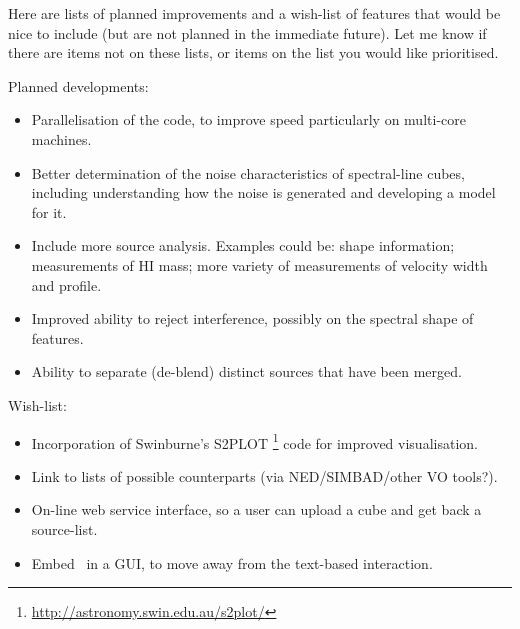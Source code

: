 
Here are lists of planned improvements and a wish-list of
features that would be nice to include (but are not planned in the
immediate future). Let me know if there are items not on these lists,
or items on the list you would like prioritised.

Planned developments:
\begin{itemize}
\item Parallelisation of the code, to improve speed particularly on
multi-core machines.

\item Better determination of the noise characteristics of
  spectral-line cubes, including understanding how the noise is
  generated and developing a model for it. 
  
\item Include more source analysis. Examples could be: shape
  information; measurements of HI mass; more variety of measurements
  of velocity width and profile. 

\item Improved ability to reject interference, possibly on the
  spectral shape of features.

\item Ability to separate (de-blend) distinct sources that have been
  merged.
\end{itemize}

Wish-list:
\begin{itemize}
\item Incorporation of Swinburne's S2PLOT
\footnote{\href{http://astronomy.swin.edu.au/s2plot/}
{http://astronomy.swin.edu.au/s2plot/}} code for improved
visualisation. 
\item Link to lists of possible counterparts (\eg via NED/SIMBAD/other
  VO tools?). 

\item On-line web service interface, so a user can upload a cube and
  get back a source-list.

\item Embed \duchamp\ in a GUI, to move away from the text-based
  interaction.
\end{itemize}

